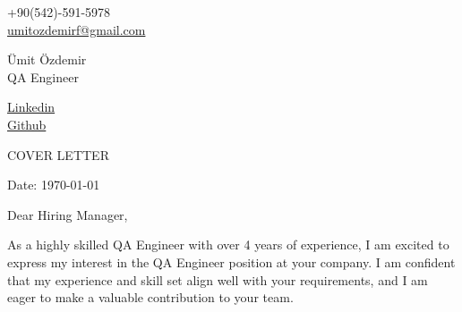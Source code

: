 \documentclass[11pt,a4]{article}
\begin{document}
\begin{center}
    \begin{minipage}[b]{0.24\textwidth}
            \large +90(542)-591-5978 \\
            \large \href{mailto:umitozdemirf@gmail.com}{umitozdemirf@gmail.com} 
    \end{minipage}%
    \begin{minipage}[b]{0.5\textwidth}
            \centering
            {\Huge Ümit Özdemir} \\ %
            \vspace{0.1cm}
            {\color{UI_blue} \Large{QA Engineer}} \\
    \end{minipage}%
    \begin{minipage}[b]{0.24\textwidth}
            \flushright \large
            {\href{https://www.linkedin.com/in/umttozdmr/}{Linkedin} } \\
            \href{https://github.com/umttozdmr}{Github}
    \end{minipage}   
    
\vspace{-0.15cm} 
{\color{UI_blue} \hrulefill}
\end{center}

\justify
\setlength{\parindent}{0pt}
\setlength{\parskip}{12pt}
\vspace{0.2cm}
\begin{center}
    {\color{UI_blue} \Large{COVER LETTER}}
\end{center}



Date: \today \par \vspace{-0.1cm}
Dear Hiring Manager, %

As a highly skilled QA Engineer with over 4 years of experience, I am excited to express my interest in the QA Engineer position at your company. I am confident that my experience and skill set align well with your requirements, and I am eager to make a valuable contribution to your team.
\end{document}
